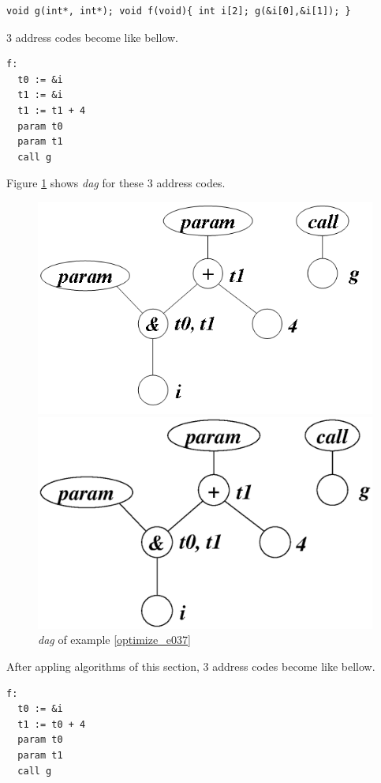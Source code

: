 \begin{Example}
\label{optimize_e037}
\begin{verbatim}
void g(int*, int*); void f(void){ int i[2]; g(&i[0],&i[1]); }
\end{verbatim}
3 address codes become like bellow.
\begin{verbatim}
f:
  t0 := &i
  t1 := &i
  t1 := t1 + 4
  param t0
  param t1
  call g
\end{verbatim}
Figure \ref{optimize_e038} shows {\em dag} for these 3 address codes.
\begin{figure}[htbp]
\begin{center}
\begin{htmlonly}
\includegraphics[width=1.0\linewidth,height=0.623\linewidth]{opt020.png}
\end{htmlonly}
\begin{latexonly}
\includegraphics[width=1.0\linewidth,height=0.623\linewidth]{opt020.eps}
\end{latexonly}
\caption{{\em dag} of example \ref{optimize_e037}}
\label{optimize_e038}
\end{center}
\end{figure}
After appling algorithms of this section,
3 address codes become like bellow.
\begin{verbatim}
f:
  t0 := &i
  t1 := t0 + 4
  param t0
  param t1
  call g
\end{verbatim}
\end{Example}

